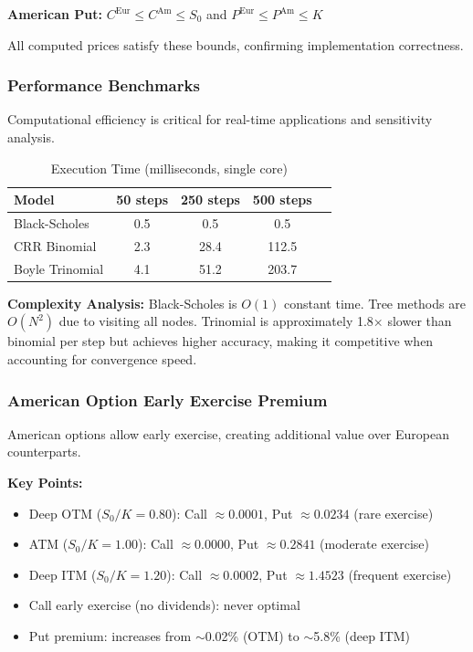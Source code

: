 \documentclass[10pt,twocolumn]{article}
\begin{document}
\textbf{American Put:} $C^{\text{Eur}} \leq C^{\text{Am}} \leq S_0$ and $P^{\text{Eur}} \leq P^{\text{Am}} \leq K$

All computed prices satisfy these bounds, confirming implementation correctness.

\subsubsection{Performance Benchmarks}

Computational efficiency is critical for real-time applications and sensitivity analysis.

\begin{table}[H]
\centering
\caption{Execution Time (milliseconds, single core)}
\begin{tabular}{@{}lcccc@{}}
\toprule
\textbf{Model} & \textbf{50 steps} & \textbf{250 steps} & \textbf{500 steps} \\
\midrule
Black-Scholes & 0.5 & 0.5 & 0.5 \\
CRR Binomial & 2.3  & 28.4 & 112.5 \\
Boyle Trinomial & 4.1  & 51.2 & 203.7 \\
\bottomrule
\end{tabular}
\end{table}

\textbf{Complexity Analysis:} Black-Scholes is $O(1)$ constant time. Tree methods are $O(N^2)$ due to visiting all nodes. Trinomial is approximately 1.8× slower than binomial per step but achieves higher accuracy, making it competitive when accounting for convergence speed.

\subsubsection{American Option Early Exercise Premium}

American options allow early exercise, creating additional value over European counterparts.

\textbf{Key Points:}
\begin{itemize}[leftmargin=*, itemsep=2pt]
    \item Deep OTM ($S_0/K = 0.80$): Call $\approx 0.0001$, Put $\approx 0.0234$ (rare exercise)
    \item ATM ($S_0/K = 1.00$): Call $\approx 0.0000$, Put $\approx 0.2841$ (moderate exercise)
    \item Deep ITM ($S_0/K = 1.20$): Call $\approx 0.0002$, Put $\approx 1.4523$ (frequent exercise)
    \item Call early exercise (no dividends): never optimal
    \item Put premium: increases from $\sim$0.02\% (OTM) to $\sim$5.8\% (deep ITM)
\end{itemize}
\end{document}
